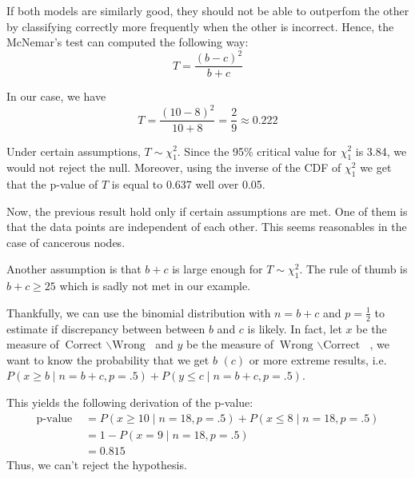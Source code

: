 \documentclass[a4 paper, 15pt]{article}
\numberwithin{equation}{section}
\begin{document}
If both models are similarly good, they should not be able to outperfom the other by classifying correctly more frequently when the other is incorrect. Hence, the McNemar's test can computed the following way:
\[
T = \frac{(b-c)^2}{b+c}
\]

In our case, we have
\[
T = \frac{(10-8)^2}{10+8} = \frac{2}{9} \approx 0.222
\]

Under certain assumptions, $T\sim \chi^2_1$. Since the 95\% critical value for $\chi^2_1$ is 3.84, we would not reject the null. Moreover, using the inverse of the CDF of $\chi^2_1$ we get that the p-value of $T$ is equal to 0.637 well over 0.05.

Now, the previous result hold only if certain assumptions are met. One of them is that the data points are independent of each other. This seems reasonables in the case of cancerous nodes.

Another assumption is that $b+c$ is large enough for $T\sim \chi^2_1$. The rule of thumb is $b+c\geq 25$ which is sadly not met in our example.

Thankfully, we can use the binomial distribution with $n= b+c$ and $p=\frac{1}{2}$ to estimate if discrepancy between between $b$ and $c$ is likely. In fact, let $x$ be the measure of $\text{Correct }\backslash \text{Wrong }$ and $y$ be the measure of $\text{Wrong }\backslash \text{Correct }$ , we want to know the probability that we get $b$ $(c)$ or more extreme results, i.e. $P(x\geq b \mid n=b+c, p=.5) + P(y\leq c \mid n=b+c, p=.5)$.

This yields the following derivation of the p-value:
\begin{align*}
  \text{p-value } &= P(x\geq 10 \mid n=18, p=.5) + P(x\leq 8 \mid n=18, p=.5)\\
  & = 1 - P(x = 9 \mid n=18, p=.5)\\
& = 0.815
\end{align*}
Thus, we can't reject the hypothesis.
\end{document}
